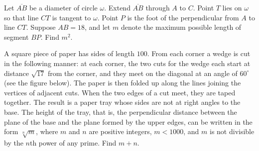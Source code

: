 \documentclass[11pt]{article}
\theoremstyle{definition}
\begin{document}
%	








\begin{question}[name={2008 AIME I, \href{https://artofproblemsolving.com/community/c4p1075202}{Problem 14}}]
	Let $ \overline{AB}$ be a diameter of circle $ \omega$. Extend $ \overline{AB}$ through $ A$ to $ C$. Point $ T$ lies on $ \omega$ so that line $ CT$ is tangent to $ \omega$. Point $ P$ is the foot of the perpendicular from $ A$ to line $ CT$. Suppose $ AB = 18$, and let $ m$ denote the maximum possible length of segment $ BP$. Find $m^{2}$.
\end{question}


%	













\begin{question}[name={2008 AIME I, \href{https://artofproblemsolving.com/community/c4p1075230}{Problem 15}}]
	A square piece of paper has sides of length $ 100$. From each corner a wedge is cut in the following manner: at each corner, the two cuts for the wedge each start at distance $ \sqrt {17}$ from the corner, and they meet on the diagonal at an angle of $ 60^\circ$ (see the figure below). The paper is then folded up along the lines joining the vertices of adjacent cuts. When the two edges of a cut meet, they are taped together. The result is a paper tray whose sides are not at right angles to the base. The height of the tray, that is, the perpendicular distance between the plane of the base and the plane formed by the upper edges, can be written in the form $ \sqrt [n]{m}$, where $ m$ and $ n$ are positive integers, $ m < 1000$, and $ m$ is not divisible by the $ n$th power of any prime. Find $ m + n$.
\end{question}


%	
\end{document}
